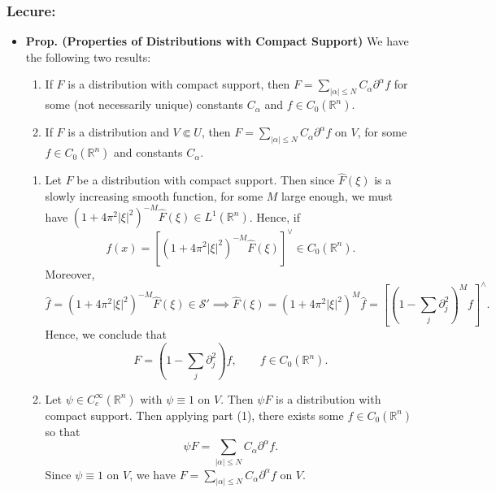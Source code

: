 \documentclass{article}
\begin{document}
\subsubsection{Lecure:} 
\begin{itemize}
	\item \textbf{Prop. (Properties of Distributions with Compact Support)} We have the following two results: \vspace{-0.25cm}
		\begin{enumerate}[itemsep =-2pt,label =(\alph{*})]
			\item If $F$ is a distribution with compact support, then $F = \sum_{|\alpha|\leq N}C_{\alpha}\partial^{\alpha}f$ for some (not necessarily unique) constants $C_{\alpha}$ and $f \in C_{0}(\mathbb{R}^{n})$. 
			\item If $F$ is a distribution and $V \Subset U$, then $F = \sum_{|\alpha|\leq N}C_{\alpha}\partial^{\alpha}f$ on $V$, for some $f \in C_{0}(\mathbb{R}^{n})$ and constants $C_{\alpha}$. 
		\end{enumerate}
	\begin{solutions}
		\begin{enumerate}[itemsep =-2pt,label = (\alph{*})]
			\item Let $F$ be a distribution with compact support. Then since $\hat{F}(\xi)$ is a slowly increasing smooth function, for some $M$ large enough, we must have $(1 + 4\pi^{2}|\xi|^{2})^{-M}\hat{F}(\xi) \in L^{1}(\mathbb{R}^{n})$. Hence, if 
				\begin{equation}
					f(x) = \left[(1 + 4\pi^{2}|\xi|^{2})^{-M}\hat{F}(\xi)\right]^{\vee} \in C_{0}(\mathbb{R}^{n}). 
				\end{equation}
			Moreover, 
				\begin{equation}
					\hat{f} = (1 + 4\pi^{2}|\xi|^{2})^{-M}\hat{F}(\xi) \in \mathcal{S}' \implies \hat{F}(\xi) = (1 + 4\pi^{2}|\xi|^{2})^{M}\hat{f} = \left[(1 - \sum_{j}\partial_{j}^{2})^{M}f\right]^{\wedge}. 
				\end{equation}
			Hence, we conclude that 
				\begin{equation}
					F = \left(1 - \sum_{j}\partial_{j}^{2}\right)f, \qquad f \in C_{0}(\mathbb{R}^{n}). 
				\end{equation}
			\item Let $\psi \in C_{c}^{\infty}(\mathbb{R}^{n})$ with $\psi \equiv 1$ on $V$. Then $\psi F$ is a distribution with compact support. Then applying part (1), there exists some $f \in C_{0}(\mathbb{R}^{n})$ so that 
				\begin{equation}
					\psi F = \sum_{|\alpha|\leq N}C_{\alpha}\partial^{\alpha}f. 
				\end{equation}
			Since $\psi \equiv 1$ on $V$, we have $F = \sum_{|\alpha|\leq N}C_{\alpha}\partial^{\alpha}f$ on $V$. 
		\end{enumerate}
	\end{solutions} 
	

\end{itemize}
\end{document}
